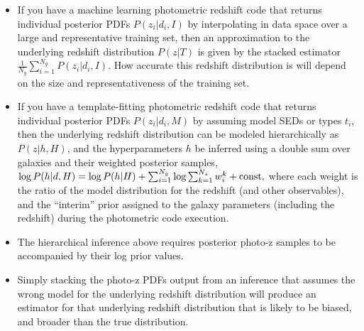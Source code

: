 \documentclass[11pt]{amsart}
\begin{document}
\begin{itemize}
    \item If you have a machine learning photometric redshift code that
    returns individual posterior PDFs $P(z_i | d_i, I)$ by interpolating
    in data space over a large and representative training set, then an
    approximation to the underlying redshift distribution $P(z | T)$ is
    given by the stacked estimator     $\frac{1}{N_g} \sum_{i=1}^{N_g}
    P(z_i | d_i, I)$. How accurate this redshift distribution is will depend 
    on the size and representativeness of the training set.

    \item If you have a template-fitting photometric redshift code that
    returns individual posterior PDFs $P(z_i | d_i, M)$ by assuming
    model SEDs or types $t_i$, then the underlying redshift distribution
    can be modeled hierarchically as $P(z | h, H)$, and the
    hyperparameters $h$ be inferred using a double sum over galaxies and
    their weighted posterior samples,   $\log P(h|d,H) = \log P(h|H) +
    \sum_{i=1}^{N_g} \log \sum_{k=1}^{N_s} w_i^k + {\rm const,}$ where
    each weight is the ratio of the model distribution for the redshift (and other observables), and the
    ``interim'' prior assigned to the galaxy parameters (including the redshift) during the
    photometric code execution.

    \item The hierarchical inference above requires posterior photo-z
    samples to be accompanied by their log prior values.
    
    \item Simply stacking the photo-z PDFs output from an inference that assumes the 
    wrong model for the underlying redshift distribution will produce an estimator for
    that underlying redshift distribution that is likely to be biased, and broader than the true distribution.
\end{itemize}



\end{document}
